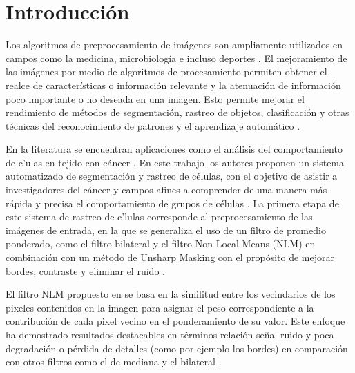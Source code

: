
\chapter{Introducción}
\label{chp:intro}

Los algoritmos de preprocesamiento de im\'agenes son ampliamente utilizados en campos como la medicina, microbiolog\'ia e incluso deportes \cite{Aggarwal2011,	Ekin2003, Ekin2003}. El mejoramiento de las im\'agenes por medio de algoritmos de procesamiento permiten obtener el realce de caracter\'isticas o informaci\'on relevante y la atenuaci\'on de informaci\'on poco importante o no deseada en una imagen. Esto permite mejorar el rendimiento de m\'etodos de segmentaci\'on, rastreo de objetos, clasificaci\'on y otras t\'ecnicas del reconocimiento de patrones y el aprendizaje autom\'atico \cite{BF2014,IMPROVESEGMENTATIONBF,CONCAPAN2016}. 

En la literatura se encuentran aplicaciones como el an\'alisis del comportamiento de c\e'ulas en tejido con  c\'ancer \cite{saenz2015deceived}. En este trabajo los autores proponen un sistema automatizado de segmentaci\'on y rastreo de c\'elulas, con el objetivo de asistir a investigadores del c\'ancer y campos afines a comprender de una  manera m\'as r\'apida y precisa el comportamiento de grupos de c\'elulas \cite{saenz2015deceived}. La primera etapa de este sistema de rastreo de c\e'lulas corresponde al preprocesamiento de las im\'agenes de entrada, en la que se generaliza el uso de un filtro de promedio ponderado, como el filtro bilateral y el filtro Non-Local Means (NLM) en combinaci\'on con un m\'etodo de Unsharp Masking con el prop\'osito de mejorar bordes, contraste y eliminar el ruido \cite{saenz2015deceived}.

El filtro NLM propuesto en \cite{buades2005non} se basa en la similitud entre los vecindarios de los pixeles contenidos en la imagen para asignar el peso correspondiente a la contribuci\'on de cada pixel vecino en el ponderamiento de su valor. Este enfoque ha demostrado resultados destacables en t\'erminos relaci\'on se\~nal-ruido y poca degradaci\'on o p\'erdida de detalles (como por ejemplo los bordes) en comparaci\'on con otros filtros como el de mediana y el bilateral \cite{CONCAPAN2016}. 

